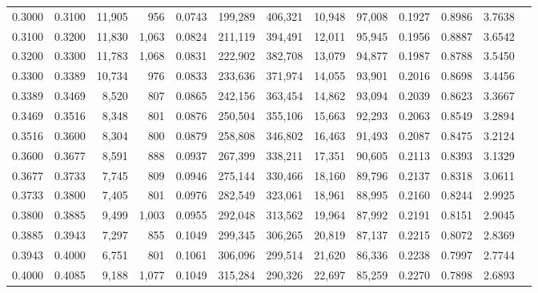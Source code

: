 \begin{tabular}{rrrrrrrrrrrrr}
0.3000 & 0.3100 & 11,905 &   956 &                                     0.0743 & 199,289 & 406,321 &  10,948 &  97,008 & 0.1927 & 0.8986 & 3.7638 \\
0.3100 & 0.3200 & 11,830 & 1,063 &                                     0.0824 & 211,119 & 394,491 &  12,011 &  95,945 & 0.1956 & 0.8887 & 3.6542 \\
0.3200 & 0.3300 & 11,783 & 1,068 &                                     0.0831 & 222,902 & 382,708 &  13,079 &  94,877 & 0.1987 & 0.8788 & 3.5450 \\
0.3300 & 0.3389 & 10,734 &   976 &                                     0.0833 & 233,636 & 371,974 &  14,055 &  93,901 & 0.2016 & 0.8698 & 3.4456 \\
0.3389 & 0.3469 &  8,520 &   807 &                                     0.0865 & 242,156 & 363,454 &  14,862 &  93,094 & 0.2039 & 0.8623 & 3.3667 \\
0.3469 & 0.3516 &  8,348 &   801 &                                     0.0876 & 250,504 & 355,106 &  15,663 &  92,293 & 0.2063 & 0.8549 & 3.2894 \\
0.3516 & 0.3600 &  8,304 &   800 &                                     0.0879 & 258,808 & 346,802 &  16,463 &  91,493 & 0.2087 & 0.8475 & 3.2124 \\
0.3600 & 0.3677 &  8,591 &   888 &                                     0.0937 & 267,399 & 338,211 &  17,351 &  90,605 & 0.2113 & 0.8393 & 3.1329 \\
0.3677 & 0.3733 &  7,745 &   809 &                                     0.0946 & 275,144 & 330,466 &  18,160 &  89,796 & 0.2137 & 0.8318 & 3.0611 \\
0.3733 & 0.3800 &  7,405 &   801 &                                     0.0976 & 282,549 & 323,061 &  18,961 &  88,995 & 0.2160 & 0.8244 & 2.9925 \\
0.3800 & 0.3885 &  9,499 & 1,003 &                                     0.0955 & 292,048 & 313,562 &  19,964 &  87,992 & 0.2191 & 0.8151 & 2.9045 \\
0.3885 & 0.3943 &  7,297 &   855 &                                     0.1049 & 299,345 & 306,265 &  20,819 &  87,137 & 0.2215 & 0.8072 & 2.8369 \\
0.3943 & 0.4000 &  6,751 &   801 &                                     0.1061 & 306,096 & 299,514 &  21,620 &  86,336 & 0.2238 & 0.7997 & 2.7744 \\
0.4000 & 0.4085 &  9,188 & 1,077 &                                     0.1049 & 315,284 & 290,326 &  22,697 &  85,259 & 0.2270 & 0.7898 & 2.6893 \\

\end{tabular}
